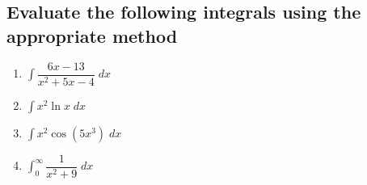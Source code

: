 \documentclass[
]{article}
\begin{document}
\hypertarget{evaluate-the-following-integrals-using-the-appropriate-method}{%
\subsection{Evaluate the following integrals using the appropriate
method}\label{evaluate-the-following-integrals-using-the-appropriate-method}}

\begin{enumerate}
	\setlength{\itemsep}{2in}
	\setcounter{enumi}{6}
\def\labelenumi{\arabic{enumi}.}
\item
  \(\displaystyle \int \dfrac{6x-13}{x^2+5x-4} \; dx\)
\item
  \(\displaystyle \int x^2 \ln x \; dx\)
\item
  \(\displaystyle \int x^2 \cos(5x^3) \; dx\)
\item
  \(\displaystyle \int_0^\infty \dfrac{1}{x^2+9} \; dx\)
\end{enumerate}
\end{document}
